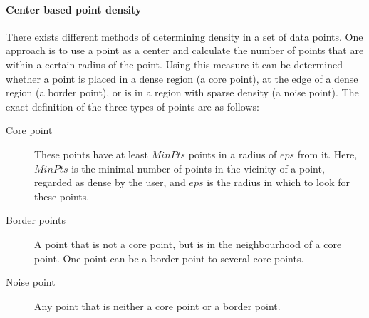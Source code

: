 \paragraph{Center based point density}
There exists different methods of determining density in a set of data points.
One approach is to use a point as a center and calculate the number of points that are within a certain radius of the point.
Using this measure it can be determined whether a point is placed in a dense region (a core point), at the edge of a dense region (a border point), or is in a region with sparse density (a noise point).
The exact definition of the three types of points are as follows\cite{pang2006introduction}:

\begin{description}
\item[Core point] These points have at least $ MinPts $ points in a radius of $ eps $ from it.
Here, $ MinPts $ is the minimal number of points in the vicinity of a point, regarded as dense by the user, and $ eps $ is the radius in which to look for these points.

\item[Border points] A point that is not a core point, but is in the neighbourhood of a core point. 
One point can be a border point to several core points.

\item[Noise point] Any point that is neither a core point or a border point. 
\end{description}

